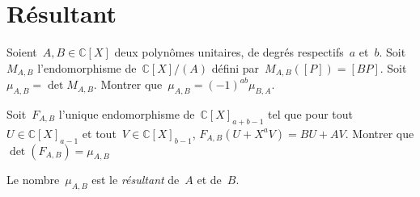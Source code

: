 \section{Résultant}

Soient~$A, B \in \mathbb{C}[X]$ deux polynômes unitaires, de degrés respectifs~$a$ et~$b$.
Soit~$M_{A,B}$ l'endomorphisme de~$\mathbb{C}[X]/(A)$ défini par~$M_{A,B}([P]) = [BP]$.
Soit~$\mu_{A, B} = \det M_{A,B}$.
Montrer que~$\mu_{A, B} = (-1)^{a b} \mu_{B, A}$.

Soit~$F_{A, B}$ l'unique endomorphisme de~$\mathbb{C}[X]_{a+b-1}$
tel que pour tout~$U \in \mathbb{C}[X]_{a-1}$ et tout~$V\in \mathbb{C}[X]_{b-1}$,
$F_{A,B}(U + X^a V) = BU + AV$.
Montrer que $\det(F_{A, B}) = \mu_{A,B}$

\begin{em}
  Le nombre~$\mu_{A,B}$ est le \emph{résultant} de~$A$ et de~$B$.
\end{em}

